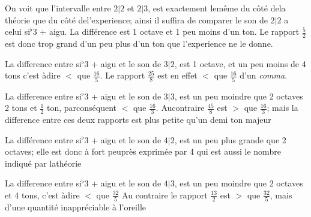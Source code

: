 \documentclass[11pt,a4paper]{article}
\begin{document}


On voit que l'intervalle entre $2|2$ et $2|3$, est exactement lemême
du côté dela théorie que du côté del'experience; ainsi il suffira
de comparer le son de $2|2$ a celui si$^{\flat}$3 + aigu. La différence
est 1 octave et 1 peu moins d'un ton. Le rapport $\frac{5}{2}$ est
donc trop grand d'un peu plus d'un ton que l'experience
ne le donne.

La difference entre si$^{\flat}$3 + aigu et le son de $3|2$, est
1 octave, et un peu moins de 4 tons c'est àdire $<$ que $\frac{16}{5}$.
Le rapport $\frac{25}{8}$  est en effet $<$ que $\frac{16}{5}$   d'un \emph{comma}.

La difference entre si$^{\flat}$3 + aigu et le son de $3|3$, est
un peu moindre que 2 octaves 2 tons et $\frac{1}{2}$ ton, parconséquent
$<$ que $\frac{16}{3}$. Aucontraire $\frac{45}{8}$ est $>$ que $\frac{16}{3}$; mais  la difference entre ces deux rapports est plus petite
qu'un demi ton majeur

La différence entre si$^{\flat}$3 + aigu et le son de $4|2$, est un
peu plus grande que 2 octaves; elle est donc à fort peuprès
exprimée par 4 qui est aussi le nombre indiqué par lathéorie

La difference entre si$^{\flat}$3 + aigu et le son de $4|3$, est un
peu moindre que 2 octaves et  4 tons, c'est àdire $<$ que $\frac{32}{5}$
Au contraire le rapport $\frac{13}{2}$ est $>$ que $\frac{32}{5}$, mais d'une quantité
inappréciable à l'oreille
\end{document}
